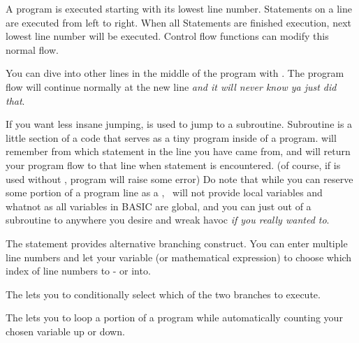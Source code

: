 A program is executed starting with its lowest line number. Statements on a line are executed from left to right. When all Statements are finished execution, next lowest line number will be executed. Control flow functions can modify this normal flow.

You can dive into other lines in the middle of the program with . The program flow will continue normally at the new line \emph{and it will never know ya just did that}.

If you want less insane jumping,  is used to jump to a subroutine. Subroutine is a little section of a code that serves as a tiny program inside of a program.  will remember from which statement in the line you have came from, and will return your program flow to that line when  statement is encountered. (of course, if  is used without , program will raise some error) Do note that while you can reserve some portion of a program line as a , \tbas\ will not provide local variables and whatnot as all variables in BASIC are global, and you can just  out of a subroutine to anywhere you desire and wreak havoc \emph{if you really wanted to}.

The  statement provides alternative branching construct. You can enter multiple line numbers and let your variable (or mathematical expression) to choose which index of line numbers to - or  into.

The  lets you to conditionally select which of the two branches to execute.

The  lets you to loop a portion of a program while automatically counting your chosen variable up or down.
